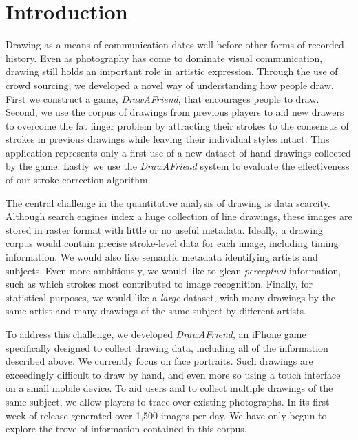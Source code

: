 \section{Introduction}

Drawing as a means of communication dates well before other forms of
recorded history. Even as photography has come to dominate visual
communication, drawing still holds an important role in artistic
expression. Through the use of crowd sourcing, we developed a novel way of understanding how people draw. 
 First we construct a game, {\em DrawAFriend}, that
encourages people to draw. Second, we use the corpus of drawings
from previous players to aid new drawers to overcome the fat finger
problem by attracting their strokes to the consensus of strokes in previous
drawings while leaving their individual styles intact. This
application represents only a first use of a new dataset of hand
drawings collected by the game. Lastly we use the {\em DrawAFriend} system to evaluate the effectiveness of our stroke correction algorithm. 

The central challenge in the quantitative analysis of drawing is
data scarcity. Although search engines index a huge collection of line
drawings, these images are stored in raster format with little
or no useful metadata. Ideally, a drawing corpus would contain
precise stroke-level data for each image, including timing
information. We would also like semantic metadata identifying
artists and subjects. Even more ambitiously, we would like to glean
\emph{perceptual} information, such as which strokes most
contributed to image recognition. Finally, for statistical purposes,
we would like a \emph{large} dataset, with many drawings by the same
artist and many drawings of the same subject by different artists.

To address this challenge, we developed \emph{DrawAFriend}, an
iPhone game specifically designed to collect drawing data, including
all of the information described above. We currently focus on face
portraits. Such drawings are exceedingly difficult to draw by hand,
and even more so using a touch interface on a small mobile device. To aid users and to
collect multiple drawings of the same subject, we allow players to
trace over existing photographs. In its first week of release \daf
generated over 1,500 images per day. We have only begun to explore
the trove of information contained in this corpus.

